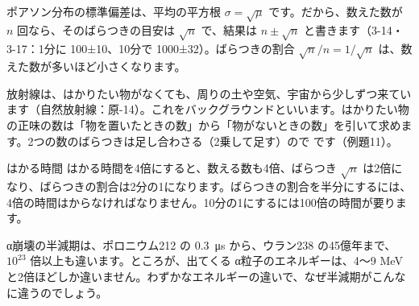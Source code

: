 \begin{bkfigure}
\label{ph:原-12:fig-poisson}
\end{bkfigure}

ポアソン分布の標準偏差は、平均の平方根 $\sigma=\sqrt\mu$ です。だから、数えた数が $n$ 回なら、そのばらつきの目安は $\sqrt n$ で、結果は $n\pm\sqrt n$ と書きます（3-14・3-17：1分に 100±10、10分で 1000±32）。ばらつきの割合 $\sqrt n/n=1/\sqrt n$ は、数えた数が多いほど小さくなります。

放射線は、はかりたい物がなくても、周りの土や空気、宇宙から少しずつ来ています（自然放射線：原-14）。これをバックグラウンドといいます。はかりたい物の正味の数は「物を置いたときの数」から「物がないときの数」を引いて求めます。2つの数のばらつきは足し合わさる（2乗して足す）ので
です（例題11）。

\begin{phbaisuru}[4倍]{はかる時間}
はかる時間を4倍にすると、数える数も4倍、ばらつき $\sqrt n$ は2倍になり、ばらつきの割合は2分の1になります。ばらつきの割合を半分にするには、4倍の時間はからなければなりません。10分の1にするには100倍の時間が要ります。
\end{phbaisuru}

\label{ph:原-12:sec10}
α崩壊の半減期は、ポロニウム212 の \qty{0.3}{\micro s} から、ウラン238 の45億年まで、$10^{23}$ 倍以上も違います。ところが、出てくる α粒子のエネルギーは、4〜9 MeV と2倍ほどしか違いません。わずかなエネルギーの違いで、なぜ半減期がこんなに違うのでしょう。

